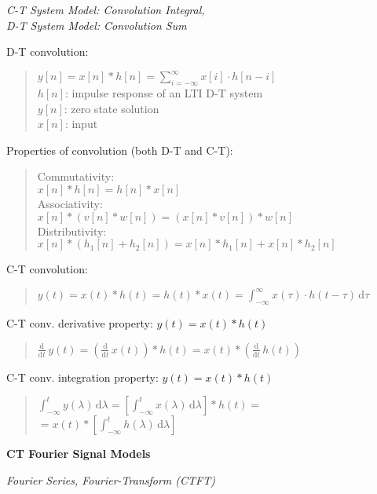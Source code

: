 \documentclass[fontsize=9pt,a4paper,twocolumn]{scrartcl}
\begin{document}
\textit{C-T System Model: Convolution Integral,\\D-T System Model: Convolution Sum}

D-T convolution:
\begin{quote}
	$\boxed{y[n]=x[n]*h[n]=\sum_{i=-\infty}^\infty x[i]\cdot h[n-i]}$
	\vspace*{0.25cm}\\
	$h[n]$: impulse response of an LTI D-T system\\
	$y[n]$: zero state solution\\
	$x[n]$: input
\end{quote}

Properties of convolution (both D-T and C-T):
\begin{quote}
	Commutativity:\\\hspace*{0.5cm} $x[n]*h[n]=h[n]*x[n]$\\
	Associativity:\\\hspace*{0.5cm} $x[n]*\left(v[n]*w[n]\right)=\left(x[n]*v[n]\right)*w[n]$\\
	Distributivity:\\\hspace*{0.5cm} $x[n]*\left(h_1[n]+h_2[n]\right)=x[n]*h_1[n]+x[n]*h_2[n]$
\end{quote}

C-T convolution:
\begin{quote}
	$\boxed{y(t)=x(t)*h(t)=h(t)*x(t)=\int_{-\infty}^\infty x(\tau)\cdot h(t-\tau)\,\mathrm{d}\tau}$
\end{quote}

C-T conv. derivative property: $y(t)=x(t)*h(t)$
\begin{quote}
	$\frac{\mathrm{d}}{\mathrm{d}t}\,y(t)=\left(\frac{\mathrm{d}}{\mathrm{d}t}\,x(t)\right)*h(t)=x(t)*\left(\frac{\mathrm{d}}{\mathrm{d}t}\,h(t)\right)$
\end{quote}

C-T conv. integration property: $y(t)=x(t)*h(t)$
\begin{quote}
	$\int_{-\infty}^t y(\lambda)\,\mathrm{d}\lambda=\left[\int_{-\infty}^t x(\lambda)\,\mathrm{d}\lambda\right]*h(t)=$\\$=x(t)*\left[\int_{-\infty}^t h(\lambda)\,\mathrm{d}\lambda\right]$
\end{quote}

\newpage
\large{\textbf{CT Fourier Signal Models}}

\textit{Fourier Series, Fourier-Transform (CTFT)}
\end{document}
